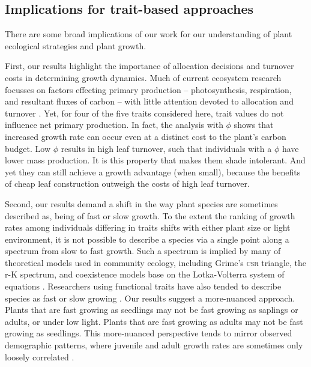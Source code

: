\documentclass[a4paper,11pt]{article}
\begin{document}
\subsection{Implications for trait-based approaches}

There are some broad implications of our work for our understanding of plant ecological strategies and plant growth.

First, our results highlight the importance of allocation decisions and turnover costs in determining growth dynamics. Much of current ecosystem research focusses on factors effecting primary production -- photosynthesis, respiration, and resultant fluxes of carbon -- with little attention devoted to allocation and turnover \citep[for comparisons of models see][]{Sitch-2008, DeKauwe-2014}. Yet, for four of the five traits considered here, trait values do not influence net primary production. In fact, the analysis with $\phi$ shows that increased growth rate can occur even at a distinct cost to the plant's carbon budget. Low $\phi$ results in high leaf turnover, such that individuals with a $\phi$ have lower mass production. It is this property that makes them shade intolerant. And yet they can still achieve a growth advantage (when small), because the benefits of cheap leaf construction outweigh the costs of high leaf turnover.


Second, our results demand a shift in the way plant species are sometimes described as, being of fast or slow growth. To the extent the ranking of growth rates among individuals differing in traits shifts with either plant size or light environment, it is not possible to describe a species via a single point along a spectrum from slow to fast growth. Such a spectrum is implied by many of theoretical models used in community ecology, including Grime's \textsc{csr} triangle, the r-K spectrum, and coexistence models base on the Lotka-Volterra system of equations \citep[e.g.][]{Grime-1977,Chesson-2000}. Researchers using functional traits have also tended to describe species as fast or slow growing \citep[e.g.][]{Adler-2014, Diaz-2016}. Our results suggest a more-nuanced approach. Plants that are fast growing as seedlings may not be fast growing as saplings or adults, or under low light. Plants that are fast growing as adults may not be fast growing as seedlings. This more-nuanced perspective tends to mirror observed demographic patterns, where juvenile and adult growth rates are sometimes only loosely correlated \citep{Rees-2001}.
\end{document}
